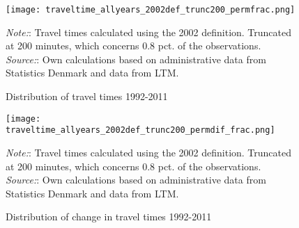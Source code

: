 \begin{figure}
\centering
\begin{minipage}{0.55\textwidth}
\texttt{[image: traveltime\_allyears\_2002def\_trunc200\_permfrac.png]} 
{\tiny \emph{Note:}: Travel times calculated using the 2002 definition. Truncated at 200 minutes, which concerns 0.8 pct. of the observations. \\ \emph{Source:}: Own calculations based on administrative data from Statistics Denmark and data from LTM.\par}
\end{minipage}
\caption{Distribution of travel times 1992-2011}
\label{fig:traveltimes}
\end{figure}

\begin{figure}
\centering
\begin{minipage}{0.55\textwidth}
\texttt{[image: traveltime\_allyears\_2002def\_trunc200\_permdif\_frac.png]} 
{\tiny \emph{Note:}: Travel times calculated using the 2002 definition. Truncated at 200 minutes, which concerns 0.8 pct. of the observations. \\ \emph{Source:}: Own calculations based on administrative data from Statistics Denmark and data from LTM.\par}
\end{minipage}
\caption{Distribution of change in travel times 1992-2011}
\label{fig:traveltimes_dif}
\end{figure}


